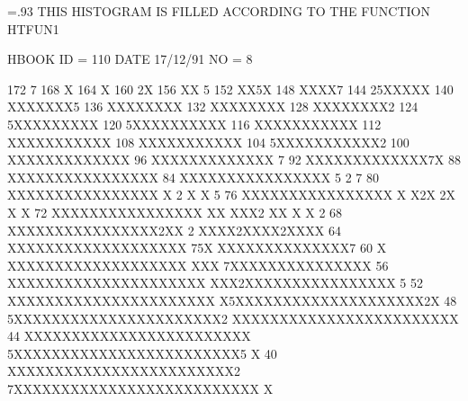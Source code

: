 \begin{Listing}\baselineskip=.93\baselineskip\relax
 THIS HISTOGRAM IS FILLED ACCORDING TO THE FUNCTION HTFUN1                       
 
 HBOOK     ID =       110                                        DATE  17/12/91              NO =   8
 
      172                                    7
      168                                    X
      164                                    X
      160                                   2X
      156                                   XX 5
      152                                   XX5X
      148                                   XXXX7
      144                                 25XXXXX
      140                                 XXXXXXX5
      136                                 XXXXXXXX
      132                                 XXXXXXXX
      128                                 XXXXXXXX2
      124                                5XXXXXXXXX
      120                               5XXXXXXXXXX
      116                               XXXXXXXXXXX
      112                               XXXXXXXXXXX
      108                               XXXXXXXXXXX
      104                              5XXXXXXXXXXX2
      100                              XXXXXXXXXXXXX
       96                              XXXXXXXXXXXXX 7
       92                              XXXXXXXXXXXXX7X
       88                             XXXXXXXXXXXXXXXX
       84                             XXXXXXXXXXXXXXXX 5                              2 7
       80                             XXXXXXXXXXXXXXXX X                        2     X X  5
       76                             XXXXXXXXXXXXXXXX X                        X2X  2X X  X
       72                             XXXXXXXXXXXXXXXX XX                       XXX2 XX X  X 2
       68                             XXXXXXXXXXXXXXXX2XX                    2  XXXX2XXXX2XXXX
       64                             XXXXXXXXXXXXXXXXXXX                  75X  XXXXXXXXXXXXXX7
       60                           X XXXXXXXXXXXXXXXXXXX                  XXX 7XXXXXXXXXXXXXXX
       56                           XXXXXXXXXXXXXXXXXXXXX                  XXX2XXXXXXXXXXXXXXXX 5
       52                           XXXXXXXXXXXXXXXXXXXXXX               X5XXXXXXXXXXXXXXXXXXXX2X
       48                          5XXXXXXXXXXXXXXXXXXXXXX2              XXXXXXXXXXXXXXXXXXXXXXXX
       44                          XXXXXXXXXXXXXXXXXXXXXXXX             5XXXXXXXXXXXXXXXXXXXXXXXX5  X
       40                          XXXXXXXXXXXXXXXXXXXXXXXX2           7XXXXXXXXXXXXXXXXXXXXXXXXXX  X

\end{Listing}
